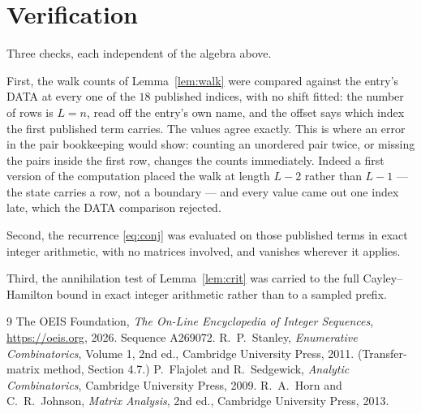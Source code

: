 \documentclass[11pt,a4paper]{article}
\theoremstyle{plain}
\theoremstyle{definition}
\begin{document}
\section{Verification}

Three checks, each independent of the algebra above.

First, the walk counts of Lemma~\ref{lem:walk} were compared against the entry's DATA at
every one of the $18$ published indices, with no shift fitted: the number of rows is
$L=n$, read off the entry's own name, and the offset says which index the first
published term carries. The values agree exactly. This is where an error in the pair
bookkeeping would show: counting an unordered pair twice, or missing the pairs inside the
first row, changes the counts immediately. Indeed a first version of the computation
placed the walk at length $L-2$ rather than $L-1$ --- the state carries a row, not a
boundary --- and every value came out one index late, which the DATA comparison rejected.

Second, the recurrence \eqref{eq:conj} was evaluated on those published terms in exact
integer arithmetic, with no matrices involved, and vanishes wherever it applies.

Third, the annihilation test of Lemma~\ref{lem:crit} was carried to the full
Cayley--Hamilton bound in exact integer arithmetic rather than to a sampled prefix.

\begin{thebibliography}{9}
 The OEIS Foundation, \emph{The On-Line Encyclopedia of Integer
Sequences}, \url{https://oeis.org}, 2026. Sequence A269072.
 R.~P.~Stanley, \emph{Enumerative Combinatorics}, Volume 1, 2nd ed.,
Cambridge University Press, 2011. (Transfer-matrix method, Section 4.7.)
 P.~Flajolet and R.~Sedgewick, \emph{Analytic Combinatorics}, Cambridge
University Press, 2009.
 R.~A.~Horn and C.~R.~Johnson, \emph{Matrix Analysis}, 2nd ed., Cambridge
University Press, 2013.
\end{thebibliography}
\end{document}
